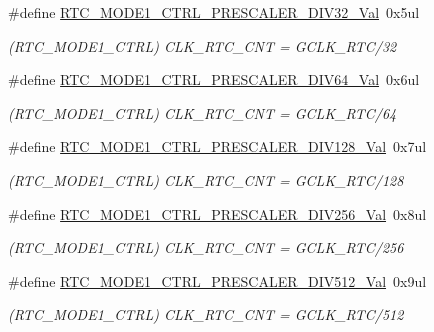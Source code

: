 \begin{DoxyCompactItemize}
\#define \mbox{\hyperlink{group___s_a_m_d21___r_t_c_gaadb4e31230473e4f4550379f40fef4f5}{R\+T\+C\+\_\+\+M\+O\+D\+E1\+\_\+\+C\+T\+R\+L\+\_\+\+P\+R\+E\+S\+C\+A\+L\+E\+R\+\_\+\+D\+I\+V32\+\_\+\+Val}}~0x5ul
\begin{DoxyCompactList}\small\item\em (R\+T\+C\+\_\+\+M\+O\+D\+E1\+\_\+\+C\+T\+RL) C\+L\+K\+\_\+\+R\+T\+C\+\_\+\+C\+NT = G\+C\+L\+K\+\_\+\+R\+T\+C/32 \end{DoxyCompactList}\item 
\#define \mbox{\hyperlink{group___s_a_m_d21___r_t_c_ga18388e853dfca859e4f0b0e97c8b66d4}{R\+T\+C\+\_\+\+M\+O\+D\+E1\+\_\+\+C\+T\+R\+L\+\_\+\+P\+R\+E\+S\+C\+A\+L\+E\+R\+\_\+\+D\+I\+V64\+\_\+\+Val}}~0x6ul
\begin{DoxyCompactList}\small\item\em (R\+T\+C\+\_\+\+M\+O\+D\+E1\+\_\+\+C\+T\+RL) C\+L\+K\+\_\+\+R\+T\+C\+\_\+\+C\+NT = G\+C\+L\+K\+\_\+\+R\+T\+C/64 \end{DoxyCompactList}\item 
\#define \mbox{\hyperlink{group___s_a_m_d21___r_t_c_gaba4ba3df4dc79b5eba5ec7d8dab4ae5e}{R\+T\+C\+\_\+\+M\+O\+D\+E1\+\_\+\+C\+T\+R\+L\+\_\+\+P\+R\+E\+S\+C\+A\+L\+E\+R\+\_\+\+D\+I\+V128\+\_\+\+Val}}~0x7ul
\begin{DoxyCompactList}\small\item\em (R\+T\+C\+\_\+\+M\+O\+D\+E1\+\_\+\+C\+T\+RL) C\+L\+K\+\_\+\+R\+T\+C\+\_\+\+C\+NT = G\+C\+L\+K\+\_\+\+R\+T\+C/128 \end{DoxyCompactList}\item 
\#define \mbox{\hyperlink{group___s_a_m_d21___r_t_c_ga1e9625562860c2b9b30668dc9ee77b9f}{R\+T\+C\+\_\+\+M\+O\+D\+E1\+\_\+\+C\+T\+R\+L\+\_\+\+P\+R\+E\+S\+C\+A\+L\+E\+R\+\_\+\+D\+I\+V256\+\_\+\+Val}}~0x8ul
\begin{DoxyCompactList}\small\item\em (R\+T\+C\+\_\+\+M\+O\+D\+E1\+\_\+\+C\+T\+RL) C\+L\+K\+\_\+\+R\+T\+C\+\_\+\+C\+NT = G\+C\+L\+K\+\_\+\+R\+T\+C/256 \end{DoxyCompactList}\item 
\#define \mbox{\hyperlink{group___s_a_m_d21___r_t_c_gac131e13ad11c76c6edf0b3401dff024e}{R\+T\+C\+\_\+\+M\+O\+D\+E1\+\_\+\+C\+T\+R\+L\+\_\+\+P\+R\+E\+S\+C\+A\+L\+E\+R\+\_\+\+D\+I\+V512\+\_\+\+Val}}~0x9ul
\begin{DoxyCompactList}\small\item\em (R\+T\+C\+\_\+\+M\+O\+D\+E1\+\_\+\+C\+T\+RL) C\+L\+K\+\_\+\+R\+T\+C\+\_\+\+C\+NT = G\+C\+L\+K\+\_\+\+R\+T\+C/512 \end{DoxyCompactList}\item 

\end{DoxyCompactItemize}
